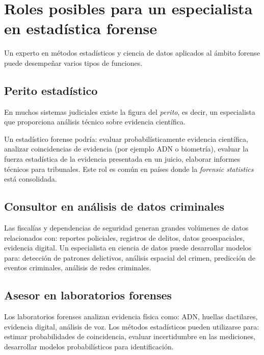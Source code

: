 \documentclass[a4paper,10pt,oneside]{article}
\begin{document}
\section{Roles posibles para un especialista en estad\'istica forense}

Un experto en m\'etodos estad\'isticos y ciencia de datos aplicados al \'ambito forense puede desempe\~nar varios tipos de funciones.

\subsection{Perito estad\'istico}

En muchos sistemas judiciales existe la figura del \textit{perito}, es decir, un especialista que proporciona an\'alisis t\'ecnico sobre evidencia cient\'ifica.

Un estad\'istico forense podr\'ia: evaluar probabil\'isticamente evidencia cient\'ifica, analizar coincidencias de evidencia (por ejemplo ADN o biometr\'ia), evaluar la fuerza estad\'istica de la evidencia presentada en un juicio, elaborar informes t\'ecnicos para tribunales. Este rol es com\'un en pa\'ises donde la \textit{forensic statistics} est\'a consolidada.

\subsection{Consultor en an\'alisis de datos criminales}

Las fiscal\'ias y dependencias de seguridad generan grandes vol\'umenes de datos relacionados con: reportes policiales, registros de delitos, datos geoespaciales, evidencia digital. Un especialista en ciencia de datos puede desarrollar modelos para: detecci\'on de patrones delictivos, an\'alisis espacial del crimen, predicci\'on de eventos criminales, an\'alisis de redes criminales.

\subsection{Asesor en laboratorios forenses}

Los laboratorios forenses analizan evidencia f\'isica como: ADN, huellas dactilares, evidencia digital, an\'alisis de voz. Los m\'etodos estad\'isticos pueden utilizarse para: estimar probabilidades de coincidencia, evaluar incertidumbre en las mediciones, desarrollar modelos probabil\'isticos para identificaci\'on.
\end{document}

